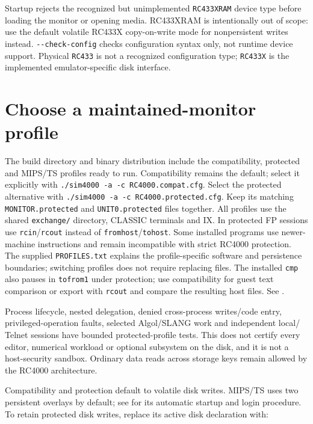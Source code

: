 Startup rejects the recognized but unimplemented \passthrough{\lstinline!RC433XRAM!} device type before loading the monitor or opening media. RC433XRAM is intentionally out of scope: use the default volatile RC433X copy-on-write mode for nonpersistent writes instead. \passthrough{\lstinline!--check-config!} checks configuration syntax only, not runtime device support. Physical \passthrough{\lstinline!RC433!} is not a recognized configuration type; \passthrough{\lstinline!RC433X!} is the implemented emulator-specific disk interface.

\section{Choose a maintained-monitor profile}\label{choose-a-maintained-monitor-profile}

The build directory and binary distribution include the compatibility,
protected and MIPS/TS profiles ready to run. Compatibility remains the default; select it explicitly
with \texttt{./sim4000 -a -c RC4000.compat.cfg}. Select the protected alternative
with \texttt{./sim4000 -a -c RC4000.protected.cfg}. Keep its matching
\texttt{MONITOR.protected} and \texttt{UNIT0.protected} files together.
All profiles use the shared \texttt{exchange/} directory, CLASSIC terminals and IX. In
protected FP sessions use \texttt{rcin}/\texttt{rcout} instead of
\texttt{fromhost}/\texttt{tohost}. Some installed programs use newer-machine
instructions and remain incompatible with strict RC4000 protection. The
supplied \texttt{PROFILES.txt} explains the profile-specific software and
persistence boundaries; switching profiles does not require replacing files.
The installed \texttt{cmp} also pauses in \texttt{tofrom1} under protection;
use compatibility for guest text comparison or export with \texttt{rcout} and
compare the resulting host files. See
.

Process lifecycle, nested delegation, denied cross-process writes/code entry,
privileged-operation faults, selected Algol/SLANG work and independent local/
Telnet sessions have bounded protected-profile tests. This does not certify
every editor, numerical workload or optional subsystem on the disk, and it is
not a host-security sandbox. Ordinary data reads across storage keys remain
allowed by the RC4000 architecture.

Compatibility and protection default to volatile disk writes. MIPS/TS uses
two persistent overlays by default; see  for its
automatic startup and login procedure. To retain protected disk writes,
replace its active disk declaration with:

